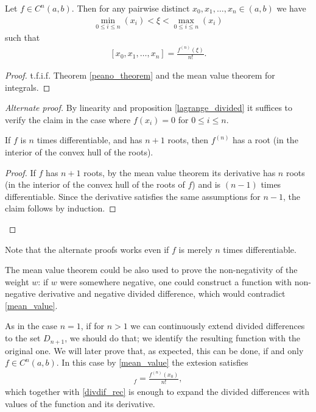 \begin{lause}
	Let $f \in C^{n}(a, b)$. Then for any pairwise distinct $x_{0}, x_{1}, \ldots, x_{n} \in (a, b)$ we have
	\begin{align*}
		\min_{0 \leq i \leq n}(x_{i}) < \xi < \max_{0 \leq i \leq n}(x_{i})
	\end{align*}
	such that
	\begin{align}\label{mean_value}
		[x_{0}, x_{1}, \ldots, x_{n}] = \frac{f^{(n)}(\xi)}{n!}.
	\end{align}
\end{lause}
\begin{proof}
	t.f.i.f. Theorem \ref{peano_theorem} and the mean value theorem for integrals.
\end{proof}
\begin{proof}[Alternate proof]
	By linearity and proposition \ref{lagrange_divided} it suffices to verify the claim in the case where $f(x_{i}) = 0$ for $0 \leq i \leq n$.
	\begin{lem}
		If $f$ is $n$ times differentiable, and has $n + 1$ roots, then $f^{(n)}$ has a root (in the interior of the convex hull of the roots).
	\end{lem}
	\begin{proof}
		If $f$ has $n + 1$ roots, by the mean value theorem its derivative has $n$ roots (in the interior of the convex hull of the roots of $f$) and is $(n - 1)$ times differentiable. Since the derivative satisfies the same assumptions for $n - 1$, the claim follows by induction.
	\end{proof}
\end{proof}

Note that the alternate proofs works even if $f$ is merely $n$ times differentiable.

The mean value theorem could be also used to prove the non-negativity of the weight $w$: if $w$ were somewhere negative, one could construct a function with non-negative derivative and negative divided difference, which would contradict \ref{mean_value}.

As in the case $n = 1$, if for $n > 1$ we can continuously extend divided differences to the set $D_{n + 1}$, we should do that; we identify the resulting function with the original one. We will later prove that, as expected, this can be done, if and only $f \in C^{n}(a, b)$. In this case by \ref{mean_value} the extesion satisfies
\begin{align*}
	[x_{0}, x_{0}, \ldots, x_{0}]_{f} = \frac{f^{(n)}(x_{0})}{n!},
\end{align*}
which together with \ref{divdif_rec} is enough to expand the divided differences with values of the function and its derivative.

